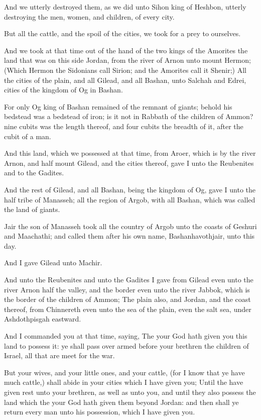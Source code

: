 \verse And we utterly destroyed them, as we did unto Sihon king of Heshbon, utterly destroying the men, women, and children, of every city.

\verse But all the cattle, and the spoil of the cities, we took for a prey to ourselves.

\verse And we took at that time out of the hand of the two kings of the Amorites the land that was on this side Jordan, from the river of Arnon unto mount Hermon; \verse (Which Hermon the Sidonians call Sirion; and the Amorites call it Shenir;) \verse All the cities of the plain, and all Gilead, and all Bashan, unto Salchah and Edrei, cities of the kingdom of Og in Bashan.

\verse For only Og king of Bashan remained of the remnant of giants; behold his bedstead was a bedstead of iron; is it not in Rabbath of the children of Ammon? nine cubits was the length thereof, and four cubits the breadth of it, after the cubit of a man.

\verse And this land, which we possessed at that time, from Aroer, which is by the river Arnon, and half mount Gilead, and the cities thereof, gave I unto the Reubenites and to the Gadites.

\verse And the rest of Gilead, and all Bashan, being the kingdom of Og, gave I unto the half tribe of Manasseh; all the region of Argob, with all Bashan, which was called the land of giants.

\verse Jair the son of Manasseh took all the country of Argob unto the coasts of Geshuri and Maachathi; and called them after his own name, Bashanhavothjair, unto this day.

\verse And I gave Gilead unto Machir.

\verse And unto the Reubenites and unto the Gadites I gave from Gilead even unto the river Arnon half the valley, and the border even unto the river Jabbok, which is the border of the children of Ammon; \verse The plain also, and Jordan, and the coast thereof, from Chinnereth even unto the sea of the plain, even the salt sea, under Ashdothpisgah eastward.

\verse And I commanded you at that time, saying, The \LORD your God hath given you this land to possess it: ye shall pass over armed before your brethren the children of Israel, all that are meet for the war.

\verse But your wives, and your little ones, and your cattle, (for I know that ye have much cattle,) shall abide in your cities which I have given you; \verse Until the \LORD have given rest unto your brethren, as well as unto you, and until they also possess the land which the \LORD your God hath given them beyond Jordan: and then shall ye return every man unto his possession, which I have given you.

